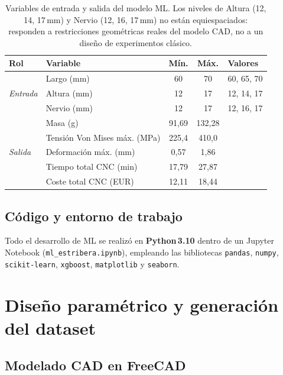 \documentclass[11pt, a4paper]{article}
\begin{document}
\begin{table}[H]
\centering
\caption{Variables de entrada y salida del modelo ML. Los niveles de Altura (12, 14, 17\,mm)
  y Nervio (12, 16, 17\,mm) no están equiespaciados: responden a restricciones geométricas
  reales del modelo CAD, no a un diseño de experimentos clásico.}
\label{tab:variables}
\begin{tabular}{@{} l l c c l @{}}
  \toprule
  \textbf{Rol}       & \textbf{Variable}                  & \textbf{Mín.} & \textbf{Máx.} & \textbf{Valores}\\
  \midrule
  \multirow{3}{*}{\textit{Entrada}}
    & Largo (mm)  & 60  & 70  & 60, 65, 70\\
    & Altura (mm) & 12  & 17  & 12, 14, 17\\
    & Nervio (mm) & 12  & 17  & 12, 16, 17\\
  \midrule
  \multirow{5}{*}{\textit{Salida}}
    & Masa (g)                          & 91{,}69 & 132{,}28 & \\
    & Tensión Von Mises máx. (MPa)      & 225{,}4 & 410{,}0  & \\
    & Deformación máx. (mm)             & 0{,}57  & 1{,}86   & \\
    & Tiempo total CNC (min)            & 17{,}79 & 27{,}87  & \\
    & Coste total CNC (EUR)             & 12{,}11 & 18{,}44  & \\
  \bottomrule
\end{tabular}
\end{table}

\subsection{Código y entorno de trabajo}

Todo el desarrollo de ML se realizó en \textbf{Python\,3.10} dentro de un
Jupyter Notebook (\texttt{ml\_estribera.ipynb}), empleando las bibliotecas
\texttt{pandas}, \texttt{numpy}, \texttt{scikit-learn}, \texttt{xgboost},
\texttt{matplotlib} y \texttt{seaborn}.


\section{Diseño paramétrico y generación del dataset}

\subsection{Modelado CAD en FreeCAD}
\end{document}
